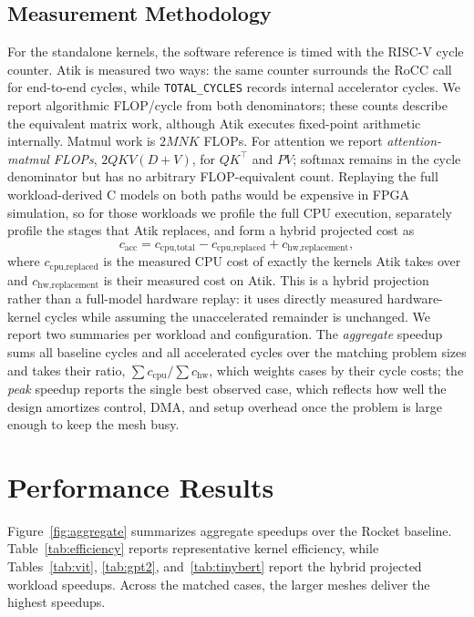 \documentclass[sigconf,nonacm]{acmart}
\begin{document}
\subsection{Measurement Methodology}
For the standalone kernels, the software reference is timed with the RISC-V
cycle counter. Atik is measured two ways: the same counter surrounds the RoCC
call for end-to-end cycles, while \texttt{TOTAL\_CYCLES} records internal
accelerator cycles. We report algorithmic FLOP/cycle from both denominators;
these counts describe the equivalent matrix work, although Atik executes
fixed-point arithmetic internally. Matmul work is
$2MNK$ FLOPs. For attention we report \emph{attention-matmul FLOPs},
$2QKV(D+V)$, for $QK^\top$ and $PV$; softmax remains in the cycle denominator
but has no arbitrary FLOP-equivalent count. Replaying the full workload-derived
C models on both paths would be expensive in FPGA simulation, so for those workloads we
profile the full CPU execution, separately profile the stages that Atik
replaces, and form a hybrid projected cost as
\begin{equation}
c_{\text{acc}} = c_{\text{cpu,total}} - c_{\text{cpu,replaced}}
               + c_{\text{hw,replacement}},
\label{eq:hybrid}
\end{equation}
where $c_{\text{cpu,replaced}}$ is the measured CPU cost of exactly the kernels
Atik takes over and $c_{\text{hw,replacement}}$ is their measured cost on Atik.
This is a hybrid projection rather than a full-model hardware replay: it uses
directly measured hardware-kernel cycles while assuming the unaccelerated
remainder is unchanged. We report two
summaries per workload and configuration. The \emph{aggregate} speedup sums all
baseline cycles and all accelerated cycles over the matching problem sizes and
takes their ratio, $\sum c_{\text{cpu}} / \sum c_{\text{hw}}$, which weights
cases by their cycle costs; the \emph{peak} speedup reports the
single best observed case, which reflects how well the design amortizes control,
DMA, and setup overhead once the problem is large enough to keep the mesh busy.

\section{Performance Results}
\label{sec:results}

Figure~\ref{fig:aggregate} summarizes aggregate speedups over the Rocket
baseline. Table~\ref{tab:efficiency} reports representative kernel efficiency,
while Tables~\ref{tab:vit}, \ref{tab:gpt2}, and~\ref{tab:tinybert} report the
hybrid projected workload speedups. Across the matched cases, the larger
meshes deliver the highest speedups.
\end{document}

